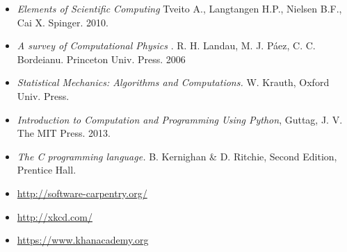 \documentclass[11pt]{article}
\begin{document}
\begin{itemize}
\item
\textit{Elements of Scientific Computing}
Tveito A., Langtangen H.P., Nielsen B.F., Cai X. Spinger. 2010.
\item
\textit{A survey of Computational Physics}
. R. H. Landau, M. J. P\'aez, C. C. Bordeianu. Princeton Univ. Press. 2006
\item 
\textit{Statistical Mechanics: Algorithms and Computations.}
W. Krauth, Oxford Univ. Press. 
\item 
\textit{Introduction to Computation and Programming Using Python},
Guttag, J. V. The MIT Press. 2013.
\item 
\textit{The C programming language.}
 B. Kernighan \& D. Ritchie, Second Edition, Prentice Hall.
\item\url{http://software-carpentry.org/}
\item\url{http://xkcd.com/}
\item\url{https://www.khanacademy.org}
\end{itemize}

 
\end{document}
